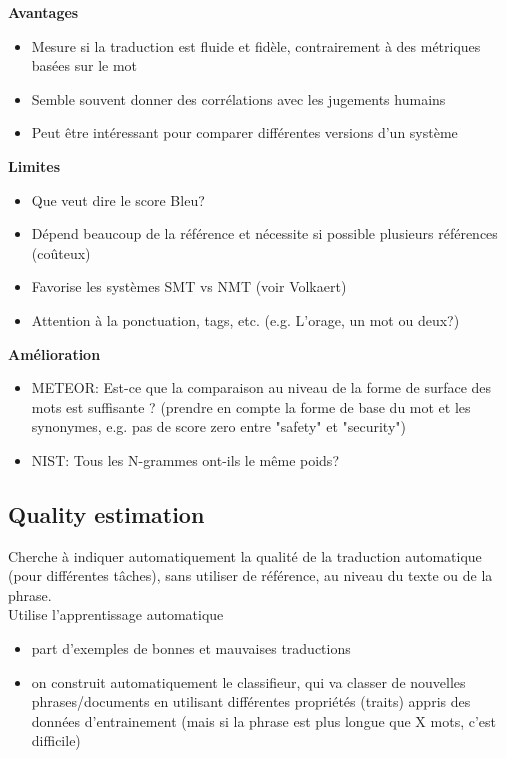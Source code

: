 \textbf{Avantages}

\begin{itemize}
    \item Mesure si la traduction est fluide et fidèle, contrairement à des métriques basées sur le mot
    \item Semble souvent donner des corrélations avec les jugements humains
    \item Peut être intéressant pour comparer différentes versions d’un système\\
\end{itemize}

\textbf{Limites}

\begin{itemize}
    \item Que veut dire le score Bleu?
    \item Dépend beaucoup de la référence et nécessite si possible plusieurs références (coûteux)
    \item Favorise les systèmes SMT vs NMT (voir Volkaert)
    \item Attention à la ponctuation, tags, etc. (e.g. L’orage, un mot ou deux?)\\
\end{itemize}

\textbf{Amélioration}

\begin{itemize}
    \item METEOR: Est-ce que la comparaison au niveau de la forme de surface des mots est suffisante ? (prendre en compte la forme de base du mot et les synonymes, e.g. pas de score zero entre "safety" et "security")
    \item NIST: Tous les N-grammes ont-ils le même poids?\\
\end{itemize}

\subsection{Quality estimation}

Cherche à indiquer automatiquement la qualité de la traduction automatique (pour différentes tâches), sans utiliser de référence, au niveau du texte ou de la phrase.\\

Utilise l’apprentissage automatique

\begin{itemize}
    \item part d’exemples de bonnes et mauvaises traductions
    \item on construit automatiquement le classifieur, qui va classer de nouvelles phrases/documents en utilisant différentes propriétés (traits) appris des données d’entrainement (mais si la phrase est plus longue que X mots, c’est difficile)\\
\end{itemize}

